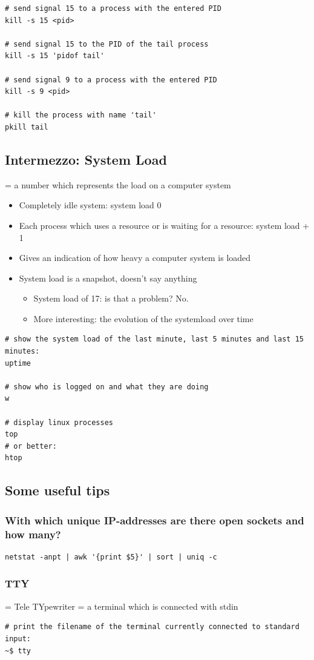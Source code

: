 \documentclass{article}
\begin{document}
\begin{verbatim}
# send signal 15 to a process with the entered PID
kill -s 15 <pid>

# send signal 15 to the PID of the tail process
kill -s 15 'pidof tail'

# send signal 9 to a process with the entered PID
kill -s 9 <pid>

# kill the process with name 'tail'
pkill tail
\end{verbatim}


\subsection{Intermezzo: System Load}

= a number which represents the load on a computer system

\begin{itemize}
    \item Completely idle system: system load 0
    \item Each process which uses a resource or is waiting for a resource: system load + 1
    \item Gives an indication of how heavy a computer system is loaded
    \item System load is a snapshot, doesn't say anything
    \begin{itemize}
        \item System load of 17: is that a problem? No.
        \item More interesting: the evolution of the systemload over time
    \end{itemize} 
\end{itemize}

\begin{verbatim}
# show the system load of the last minute, last 5 minutes and last 15 minutes:
uptime

# show who is logged on and what they are doing
w

# display linux processes
top
# or better:
htop
\end{verbatim}

\subsection{Some useful tips}

\subsubsection{With which unique IP-addresses are there open sockets and how many?}

\begin{verbatim}
netstat -anpt | awk '{print $5}' | sort | uniq -c
\end{verbatim}

\subsubsection{TTY}

= Tele TYpewriter
= a terminal which is connected with stdin

\begin{verbatim}
# print the filename of the terminal currently connected to standard input:
~$ tty


\end{verbatim}
\end{document}
